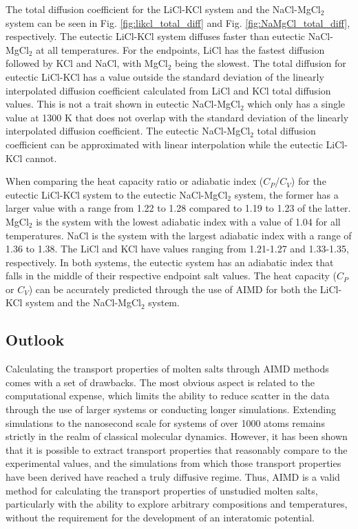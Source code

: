 \documentclass[review]{elsarticle}
\begin{document}
The total diffusion coefficient for the LiCl-KCl system and the NaCl-MgCl$_2$ system can be seen in Fig. \ref{fig:likcl_total_diff} and Fig. \ref{fig:NaMgCl_total_diff}, respectively. The eutectic LiCl-KCl system diffuses faster than eutectic NaCl-MgCl$_2$ at all temperatures. For the endpoints, LiCl has the fastest diffusion followed by KCl and NaCl, with MgCl$_2$ being the slowest. The total diffusion for eutectic LiCl-KCl has a value outside the standard deviation of the linearly interpolated diffusion coefficient calculated from LiCl and KCl total diffusion values. This is not a trait shown in eutectic NaCl-MgCl$_2$ which only has a single value at 1300 K that does not overlap with the standard deviation of the linearly interpolated diffusion coefficient. The eutectic NaCl-MgCl$_2$ total diffusion coefficient can be approximated with linear interpolation while the eutectic LiCl-KCl cannot.


When comparing the heat capacity ratio or adiabatic index ($C_P$/$C_V$) for the eutectic LiCl-KCl system to the eutectic NaCl-MgCl$_2$ system, the former has a larger value with a range from 1.22 to 1.28 compared to 1.19 to 1.23 of the latter. MgCl$_2$ is the system with the lowest adiabatic index with a value of 1.04 for all temperatures. NaCl is the system with the largest adiabatic index with a range of 1.36 to 1.38. The LiCl and KCl have values ranging from 1.21-1.27 and 1.33-1.35, respectively. In both systems, the eutectic system has an adiabatic index that falls in the middle of their respective endpoint salt values. The heat capacity ($C_P$ or $C_V$) can be accurately predicted through the use of AIMD for both the LiCl-KCl system and the NaCl-MgCl$_2$ system.

\subsection{Outlook}
Calculating the transport properties of molten salts through AIMD methods comes with a set of drawbacks. The most obvious aspect is related to the computational expense, which limits the ability to reduce scatter in the data through the use of larger systems or conducting longer simulations. Extending simulations to the nanosecond scale for systems of over 1000 atoms remains strictly in the realm of classical molecular dynamics. However, it has been shown that it is possible to extract transport properties that reasonably compare to the experimental values, and the simulations from which those transport properties have been derived have reached a truly diffusive regime. Thus, AIMD is a valid method for calculating the transport properties of unstudied molten salts, particularly with the ability to explore arbitrary compositions and temperatures, without the requirement for the development of an interatomic potential. 
\end{document}
